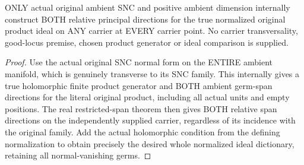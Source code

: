 \begin{lemma}
\label{hir:sharp-original-snc-product-normalized-relative-generators}
\leanok
ONLY actual original ambient SNC and positive ambient dimension internally
construct BOTH relative principal directions for the true normalized
original product ideal on ANY carrier at EVERY carrier point. No carrier
transversality, good-locus premise, chosen product generator or ideal
comparison is supplied.
\end{lemma}
\begin{proof}
Use the actual original SNC normal form on the ENTIRE ambient manifold,
which is genuinely transverse to its SNC family. This internally gives
a true holomorphic finite product generator and BOTH ambient germ-span
directions for the literal original product, including all actual units
and empty positions. The real restricted-span theorem then gives BOTH
relative span directions on the independently supplied carrier, regardless
of its incidence with the original family. Add the actual holomorphic
condition from the defining normalization to obtain precisely the desired
whole normalized ideal dictionary, retaining all normal-vanishing germs.
\end{proof}

